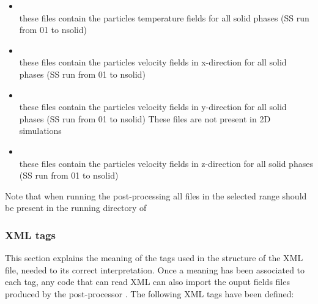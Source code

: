 \begin{itemize}
\item {} \\
      these files contain the particles temperature fields
      for all solid phases (SS run from 01 to nsolid)

\item {} \\
      these files contain the particles velocity fields in x-direction
      for all solid phases (SS run from 01 to nsolid)

\item {} \\
      these files contain the particles velocity fields in y-direction
      for all solid phases (SS run from 01 to nsolid)
      These files are not present in 2D simulations

\item {} \\
      these files contain the particles velocity fields in z-direction
      for all solid phases (SS run from 01 to nsolid)

\end{itemize}

Note that when running the post-processing all 
 files in the selected range should 
be present in the running directory of 

\subsubsection{XML tags}

This section explains the meaning of the tags used in the structure
of the XML file, needed to its correct interpretation.
Once a meaning has been associated to each tag, any code
that can read XML can also import the ouput fields files 
produced by the post-processor  .
The following XML tags have been defined:

